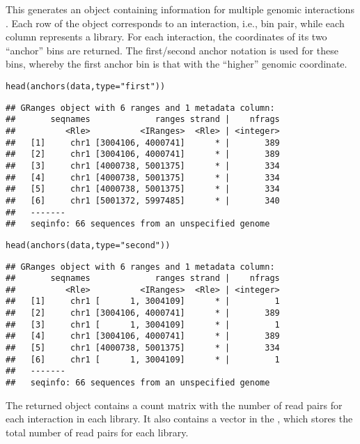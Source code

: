\documentclass{report}\usepackage[]{graphicx}\usepackage[usenames,dvipsnames]{color}
\newcommand{\hlstr}[1]{\textcolor[rgb]{0.251,0.627,0.251}{#1}}%
\newcommand{\hlstd}[1]{\textcolor[rgb]{0.251,0.251,0.251}{#1}}%
\newcommand{\hlkwc}[1]{\textcolor[rgb]{0.251,0.251,0.251}{#1}}%
\newcommand{\hlkwd}[1]{\textcolor[rgb]{0.878,0.439,0.125}{#1}}%
\newenvironment{knitrout}{}{} %
\begin{document}
This generates an  object containing information for multiple genomic interactions \cite{lun2016infrastructure}.
Each row of the object corresponds to an interaction, i.e., bin pair, while each column represents a library.
For each interaction, the coordinates of its two ``anchor'' bins are returned.
The first/second anchor notation is used for these bins, whereby the first anchor bin is that with the ``higher'' genomic coordinate.

\begin{knitrout}
\color{fgcolor}\begin{kframe}
\begin{alltt}
\hlkwd{head}\hlstd{(}\hlkwd{anchors}\hlstd{(data,} \hlkwc{type}\hlstd{=}\hlstr{"first"}\hlstd{))}
\end{alltt}
\begin{verbatim}
## GRanges object with 6 ranges and 1 metadata column:
##       seqnames             ranges strand |    nfrags
##          <Rle>          <IRanges>  <Rle> | <integer>
##   [1]     chr1 [3004106, 4000741]      * |       389
##   [2]     chr1 [3004106, 4000741]      * |       389
##   [3]     chr1 [4000738, 5001375]      * |       334
##   [4]     chr1 [4000738, 5001375]      * |       334
##   [5]     chr1 [4000738, 5001375]      * |       334
##   [6]     chr1 [5001372, 5997485]      * |       340
##   -------
##   seqinfo: 66 sequences from an unspecified genome
\end{verbatim}
\begin{alltt}
\hlkwd{head}\hlstd{(}\hlkwd{anchors}\hlstd{(data,} \hlkwc{type}\hlstd{=}\hlstr{"second"}\hlstd{))}
\end{alltt}
\begin{verbatim}
## GRanges object with 6 ranges and 1 metadata column:
##       seqnames             ranges strand |    nfrags
##          <Rle>          <IRanges>  <Rle> | <integer>
##   [1]     chr1 [      1, 3004109]      * |         1
##   [2]     chr1 [3004106, 4000741]      * |       389
##   [3]     chr1 [      1, 3004109]      * |         1
##   [4]     chr1 [3004106, 4000741]      * |       389
##   [5]     chr1 [4000738, 5001375]      * |       334
##   [6]     chr1 [      1, 3004109]      * |         1
##   -------
##   seqinfo: 66 sequences from an unspecified genome
\end{verbatim}
\end{kframe}
\end{knitrout}

The returned  object contains a count matrix with the number of read pairs for each interaction in each library.
It also contains a  vector in the , which stores the total number of read pairs for each library.
\end{document}
